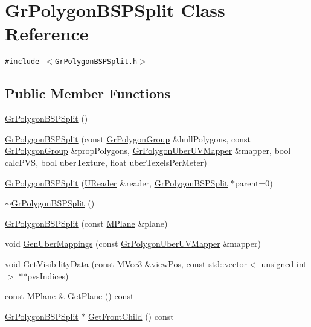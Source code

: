 \hypertarget{class_gr_polygon_b_s_p_split}{
\section{GrPolygonBSPSplit Class Reference}
\label{class_gr_polygon_b_s_p_split}
}
{\tt \#include $<$GrPolygonBSPSplit.h$>$}

\subsection*{Public Member Functions}
\begin{CompactItemize}
\item 
\hyperlink{class_gr_polygon_b_s_p_split_b4581d78385c38f4e55618f5ca6f3d1f}{GrPolygonBSPSplit} ()
\item 
\hyperlink{class_gr_polygon_b_s_p_split_27240e6e1d1ae6f058d9cfc2f4e3539c}{GrPolygonBSPSplit} (const \hyperlink{class_gr_polygon_group}{GrPolygonGroup} \&hullPolygons, const \hyperlink{class_gr_polygon_group}{GrPolygonGroup} \&propPolygons, \hyperlink{class_gr_polygon_uber_u_v_mapper}{GrPolygonUberUVMapper} \&mapper, bool calcPVS, bool uberTexture, float uberTexelsPerMeter)
\item 
\hyperlink{class_gr_polygon_b_s_p_split_bc3191cb222385455c374f5d7a3d4d56}{GrPolygonBSPSplit} (\hyperlink{class_u_reader}{UReader} \&reader, \hyperlink{class_gr_polygon_b_s_p_split}{GrPolygonBSPSplit} $\ast$parent=0)
\item 
\hyperlink{class_gr_polygon_b_s_p_split_4976f28cdf9918a062268bf48bc33169}{$\sim$GrPolygonBSPSplit} ()
\item 
\hyperlink{class_gr_polygon_b_s_p_split_97acdea709174afce4d84deb115abc9b}{GrPolygonBSPSplit} (const \hyperlink{class_m_plane}{MPlane} \&plane)
\item 
void \hyperlink{class_gr_polygon_b_s_p_split_cb59fb26224b90718ee2152591ce1689}{GenUberMappings} (const \hyperlink{class_gr_polygon_uber_u_v_mapper}{GrPolygonUberUVMapper} \&mapper)
\item 
void \hyperlink{class_gr_polygon_b_s_p_split_39017ae93b1f5f803a48e40f16ab5458}{GetVisibilityData} (const \hyperlink{class_m_vec3}{MVec3} \&viewPos, const std::vector$<$ unsigned int $>$ $\ast$$\ast$pvsIndices)
\item 
const \hyperlink{class_m_plane}{MPlane} \& \hyperlink{class_gr_polygon_b_s_p_split_1ccd3b94364851f152fb982679c2b348}{GetPlane} () const 
\item 
\hyperlink{class_gr_polygon_b_s_p_split}{GrPolygonBSPSplit} $\ast$ \hyperlink{class_gr_polygon_b_s_p_split_8a418bd7c053b3249cffedef4c13c74a}{GetFrontChild} () const 
$$
\end{CompactItemize}

